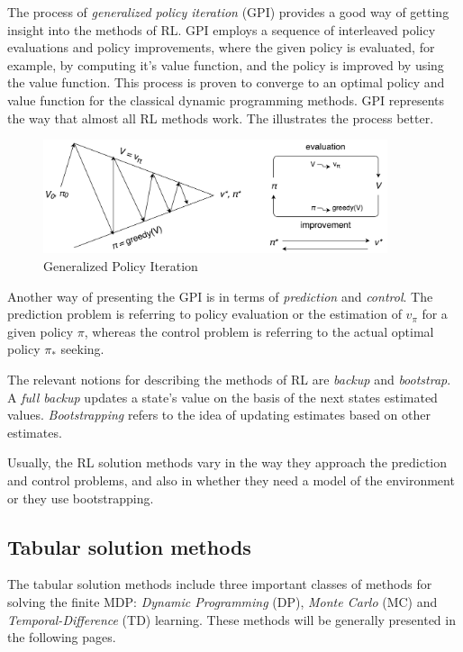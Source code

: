 The process of \textit{generalized policy iteration} (GPI) provides a good way of getting insight into the methods of RL. GPI employs a sequence of interleaved policy evaluations and policy improvements, where the given policy is evaluated, for example, by computing it's value function, and the policy is improved by using the value function. This process is proven to converge to an optimal policy and value function for the classical dynamic programming methods. GPI represents the way that almost all RL methods work. The  illustrates the process better.
\begin{figure}[H]
	\centering
	\includegraphics[width=0.9\textwidth]{Figures/GPI}
	\caption{Generalized Policy Iteration}
	\label{fig:GPI}
\end{figure}
Another way of presenting the GPI is in terms of \textit{prediction} and \textit{control}. The prediction problem is referring to policy evaluation or the estimation of $v_{\pi}$ for a given policy $\pi$, whereas the control problem is referring to the actual optimal policy $\pi_{*}$ seeking.

The relevant notions for describing the methods of RL are \textit{backup} and \textit{bootstrap}. A \textit{full backup} updates a state's value on the basis of the next states estimated values. \textit{Bootstrapping} refers to the idea of updating estimates based on other estimates.

Usually, the RL solution methods vary in the way they approach the prediction and control problems, and also in whether they need a model of the environment or they use bootstrapping.

\subsection{Tabular solution methods}
The tabular solution methods include three important classes of methods for solving the finite MDP: \textit{Dynamic Programming} (DP), \textit{Monte Carlo} (MC) and \textit{Temporal-Difference} (TD) learning. These methods will be generally presented in the following pages.

